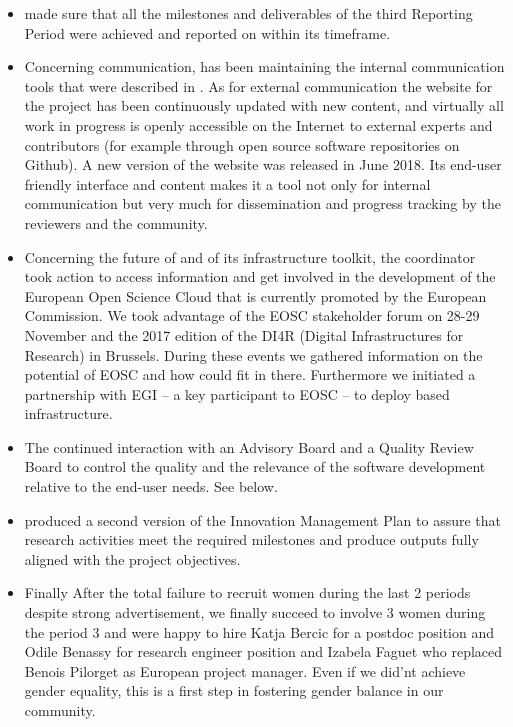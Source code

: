 \begin{itemize}
\item {} made sure that all the milestones and deliverables of
  the third Reporting Period were achieved and reported on within its
  timeframe.
\item Concerning communication,  has been maintaining the
  internal communication tools that were described in
  . As for external
  communication the website for the project has been continuously
  updated with new content, and virtually all work in progress is
  openly accessible on the Internet to external experts and
  contributors (for example through open source software repositories
  on Github). A new version of the website was released in June 2018.
  Its end-user friendly interface and content makes it a tool not only
  for internal communication but very much for dissemination and
  progress tracking by the reviewers and the community.
\item Concerning the future of \ODK and of its infrastructure toolkit,
  the coordinator took action to access information and get involved
  in the development of the European Open Science Cloud that is
  currently promoted by the European Commission. We took advantage of
  the EOSC stakeholder forum on 28-29 November and the 2017 edition of
  the DI4R (Digital Infrastructures for Research) in Brussels. During
  these events we gathered information on the potential of EOSC and
  how \ODK could fit in there. Furthermore we initiated a partnership
  with EGI -- a key participant to EOSC -- to deploy \ODK based
  infrastructure.
\item The continued interaction with an Advisory Board and a Quality
  Review Board to control the quality and the relevance of the
  software development relative to the end-user needs. See below.
\item {} produced a second version of the Innovation Management Plan
 to assure that research activities meet the required milestones and produce outputs fully aligned with the project objectives.
 
\item Finally After the total failure to recruit women during the last 2 periods despite strong advertisement, 
we finally succeed to involve 3 women during the period 3 and were happy to hire Katja Bercic for a postdoc position and 
Odile Benassy for research engineer position and Izabela Faguet who replaced Benois Pilorget as European project manager. Even if we did'nt achieve gender equality, this is a first step in fostering gender balance in our community.


\end{itemize}
